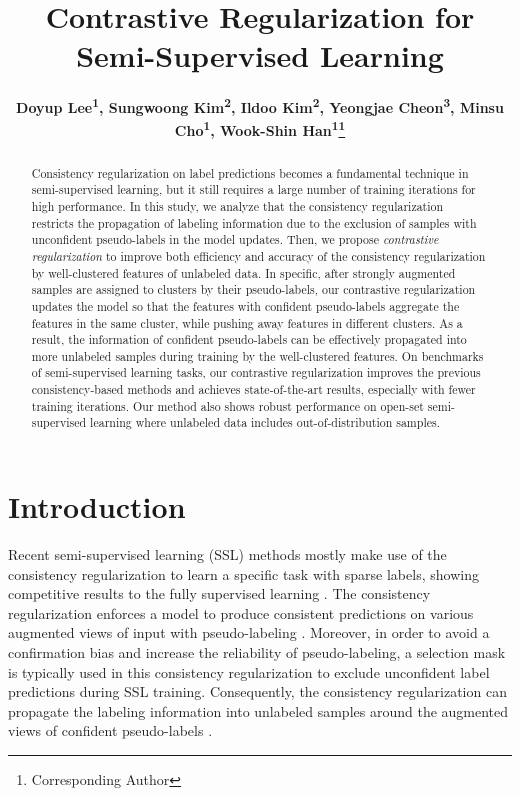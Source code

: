 \documentclass[letterpaper]{article} \usepackage{aaai22}  \usepackage{times}  \usepackage{helvet}  \usepackage{courier}  \usepackage[hyphens]{url}  \usepackage{graphicx} \urlstyle{rm} \def\UrlFont{\rm}  \usepackage{natbib}  \usepackage{caption} \DeclareCaptionStyle{ruled}{labelfont=normalfont,labelsep=colon,strut=off} \frenchspacing  \setlength{\pdfpagewidth}{8.5in}  \setlength{\pdfpageheight}{11in}  \usepackage{algorithm}
\title{Contrastive Regularization for Semi-Supervised Learning}
\author{
    \Large \textbf{Doyup Lee\textsuperscript{\rm 1}, 
                    Sungwoong Kim\textsuperscript{\rm 2}, 
                    Ildoo Kim\textsuperscript{\rm 2}, 
                    Yeongjae Cheon\textsuperscript{\rm 3}, 
                    Minsu Cho\textsuperscript{\rm 1}, 
                    Wook-Shin Han\textsuperscript{\rm 1}\thanks{Corresponding Author}} \\
}
\begin{document}
\maketitle


\begin{abstract}
  Consistency regularization on label predictions becomes a fundamental technique in semi-supervised learning, but it still requires a large number of training iterations for high performance.
  In this study, we analyze that the consistency regularization restricts the propagation of labeling information due to the exclusion of samples with unconfident pseudo-labels in the model updates.
  Then, we propose \textit{contrastive regularization} to improve both efficiency and accuracy of the consistency regularization by well-clustered features of unlabeled data.
  In specific, after strongly augmented samples are assigned to clusters by their pseudo-labels, our contrastive regularization updates the model so that the features with confident pseudo-labels aggregate the features in the same cluster, while pushing away features in different clusters.
  As a result, the information of confident pseudo-labels can be effectively propagated into more unlabeled samples during training by the well-clustered features.
  On benchmarks of semi-supervised learning tasks, our contrastive regularization improves the previous consistency-based methods and achieves state-of-the-art results, especially with fewer training iterations.
  Our method also shows robust performance on open-set semi-supervised learning where unlabeled data includes out-of-distribution samples.
  
\end{abstract}

\section{Introduction}
\label{sec:introduction}

Recent semi-supervised learning (SSL) methods mostly make use of the consistency regularization to learn a specific task with sparse labels, showing competitive results to the fully supervised learning \cite{berthelot2019remixmatch,sohn2020fixmatch,li2020comatch}.
The consistency regularization enforces a model to produce consistent predictions on various augmented views of input with pseudo-labeling \cite{lee2013pseudo}. 
Moreover, in order to avoid a confirmation bias \cite{arazo2020pseudo} and increase the reliability of pseudo-labeling, a selection mask is typically used in this consistency regularization to exclude unconfident label predictions during SSL training. 
Consequently, the consistency regularization can propagate the labeling information into unlabeled samples around the augmented views of confident pseudo-labels \cite{ghosh2021data}.
\end{document}

